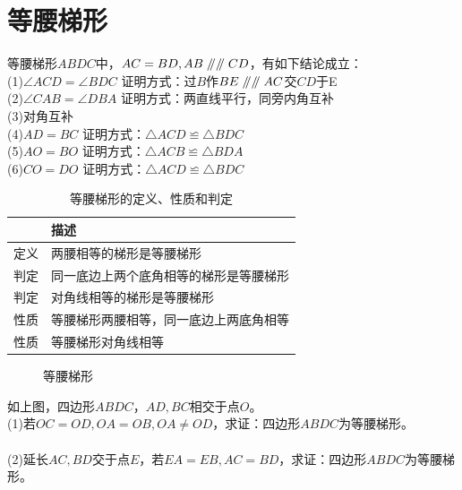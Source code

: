 \section{等腰梯形}
\begin{theorem}
    等腰梯形$ABDC$中，$AC=BD,AB\mathrel{/\mkern-5mu/}\mathrel{/\mkern-5mu/} CD$，有如下结论成立： \\
    (1)$\angle ACD=\angle BDC $  证明方式：过$B$作$BE \mathrel{/\mkern-5mu/} \mathrel{/\mkern-5mu/} AC$交$CD$于E \\
    (2)$\angle CAB=\angle DBA $  证明方式：两直线平行，同旁内角互补\\
    (3)对角互补 \\
    (4)$AD=BC$ 证明方式：$\triangle ACD \backcong \triangle BDC$ \\
    (5)$AO=BO$ 证明方式：$\triangle ACB \backcong \triangle BDA$ \\
    (6)$CO=DO$ 证明方式：$\triangle ACD\backcong \triangle BDC$
\end{theorem}
\begin{table}[H]
    \centering
    \caption{等腰梯形的定义、性质和判定}
    \begin{tabular}{|l|l|}
        \hline
           & 描述                  \\
        \hline
        定义 & 两腰相等的梯形是等腰梯形        \\
        \hline
        判定 & 同一底边上两个底角相等的梯形是等腰梯形 \\
        \hline
        判定 & 对角线相等的梯形是等腰梯形       \\
        \hline
        性质 & 等腰梯形两腰相等，同一底边上两底角相等 \\
        \hline
        性质 & 等腰梯形对角线相等           \\
        \hline
    \end{tabular}
\end{table}
\begin{figure}[H]
    \centering
    \resizebox{4cm}{!}{}
    \caption{等腰梯形}
\end{figure}
\begin{problem}
如上图，四边形$ABDC$，$AD,BC$相交于点$O$。\\
(1)若$OC=OD,OA=OB,OA\ne OD$，求证：四边形$ABDC$为等腰梯形。 \\
\\
(2)延长$AC,BD$交于点$E$，若$EA=EB,AC=BD$，求证：四边形$ABDC$为等腰梯形。\\
\end{problem}
